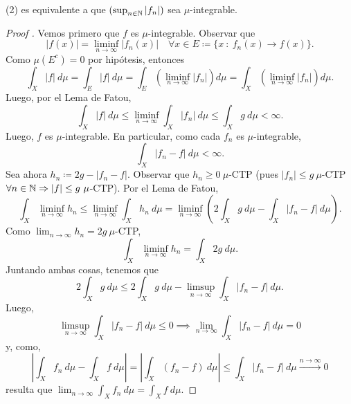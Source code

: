 \begin{remark}
	(2) es equivalente a que $(\sup_{n\in\mathbb{N}} |f_{n}|)$ sea $\mu$-integrable.
\end{remark}

\begin{proof}[Proof ]
	Vemos primero que $f$ es $\mu$-integrable. Observar que
	\[ |f(x)| = \liminf_{n \to \infty} |f_{n}(x)| \quad \forall x \in E \coloneq \{x \ : \ f_{n}(x) \longrightarrow f(x)\}. \] 
	Como $\mu(E^{c}) = 0$ por hipótesis, entonces
	\[ \int_{X} |f| \ d\mu = \int_{E} |f| \ d\mu = \int_{E} \left(\liminf_{n \to \infty} |f_{n}| \right) d\mu = \int_{X} \left( \liminf_{n \to \infty} |f_{n}| \right) d\mu. \]
	Luego, por el Lema de Fatou,
	\[ \int_{X} |f| \ d\mu \leq \liminf_{n \to \infty} \int_{X} |f_{n}| \ d\mu \leq \int_{X} g \ d\mu < \infty. \]
	Luego, $f$ es $\mu$-integrable. En particular, como cada $f_{n}$ es $\mu$-integrable,
	\[ \int_{X} |f_{n} - f| \ d\mu < \infty. \]
	Sea ahora $h_{n} \coloneq 2g - |f_{n} - f|$. Observar que $h_{n} \geq 0 \ \mu$-CTP (pues $|f_{n}| \leq g \ \mu$-CTP $\forall n \in \N \implies |f| \leq g \ \mu$-CTP). Por el Lema de Fatou,
	\[ \int_{X} \liminf_{n \to \infty} h_{n} \leq \liminf_{n \to \infty} \int_{X} h_{n} \ d\mu = \liminf_{n \to \infty} \left(2 \int_{X} g \ d\mu - \int_{X} |f_n - f| \ d\mu \right). \]
	Como $\lim_{n \to \infty} h_{n} = 2g \ \mu$-CTP,
	\[ \int_{X} \liminf_{n \to \infty} h_{n} = \int_{X} 2g \ d\mu. \]
	Juntando ambas cosas, tenemos que
	\[ 2 \int_{X} g \ d\mu \leq 2 \int_{X} g \ d\mu - \limsup_{n \to \infty} \int_{X} |f_{n} - f| \ d\mu. \]
	Luego, 
	\[ \limsup_{n \to \infty} \int_{X} |f_{n} - f| \ d\mu \leq 0 \implies \lim_{n \to \infty} \int_{X} |f_{n} - f| \ d\mu = 0 \]
	y, como,
	\[ \left| \int_{X} f_{n} \ d\mu - \int_{X} f \ d\mu \right| = \left| \int_{X}(f_{n} - f) \ d\mu \right| \leq \int_{X} |f_{n} - f| \ d\mu \stackrel{n \to \infty}{\longrightarrow} 0 \]
	resulta que $\lim_{n \to \infty} \int_{X} f_{n} \ d\mu = \int_{X} f \ d\mu$.
\end{proof}
